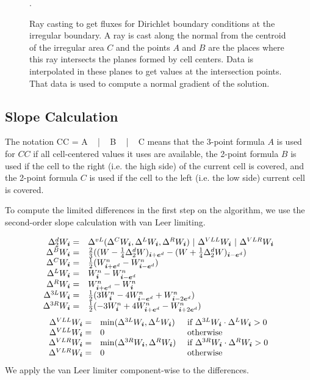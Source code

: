 \begin{figure}
\hspace{0.5in}  \epsfxsize=3.5in 
\caption{Ray casting to get fluxes for Dirichlet boundary conditions
  at the irregular boundary.   A ray is cast along the normal from the
  centroid of the irregular area $C$ and the points $A$ and $B$ are
  the places where this ray intersects the planes formed by cell
  centers.   Data is interpolated  in these planes to get
  values at the intersection points.    That data is used to compute a
  normal gradient of the solution.}
\label{fig::johansenExtrap3d}.    
\end{figure}
\subsection{Slope Calculation} \label{sec::slopeCalculation}
  
The notation
\beqa
CC = A ~ | ~ B ~ | ~ C
\eeqa
means that
the 3-point formula $A$ is used for $CC$ if all cell-centered values it uses
are available,
the 2-point formula $B$ is used if the cell to the right (i.e. the high side) of the current cell is covered, and
the 2-point formula $C$ is used if the cell to the left (i.e. the low side) current cell is covered. 

To compute the limited differences in the first step on the algorithm, we use the second-order slope calculation 
\cite{BCG} with van Leer limiting.

$$
\begin{array}{r l}
\Delta^d_2 W_\ibold = & 
\Delta^{vL}(\Delta^C W_\ibold, \Delta^L W_\ibold, \Delta^R
W_\ibold)~|~\Delta^{VLL} W_\ibold~|~\Delta^{VLR} W_\ibold \\ 
\Delta^B W_\ibold = &  \frac{2}{3}((W -\frac{1}{4}\Delta^d_2
W)_{\ibold + \ebold^d} - 
(W + \frac{1}{4}\Delta^d_2 W)_{\ibold -\ebold^d}) \\
\Delta^C {W}_\ibold = &  \half(W^n_{\ibold+\ebold^d} -
                                 W^n_{\ibold-\ebold^d}) \\
\Delta^L {W}_\ibold = &  W^n_\ibold           - W^n_{\ibold-\ebold^d} \\ 
\Delta^R {W}_\ibold = & W^n_{\ibold+\ebold^d} - W^n_\ibold  \\
\Delta^{3L} {W}_\ibold = &  \frac{1}{2}(3 W^n_\ibold -4 W^n_{\ibold-\ebold^d} + W^n_{\ibold-2\ebold^d})\\ 
\Delta^{3R} {W}_\ibold = &  \frac{1}{2}(-3 W^n_\ibold+4
W^n_{\ibold+\ebold^d} - W^n_{\ibold+2\ebold^d}) 
\end{array}
$$
$$
\begin{array}{r l l}
\Delta^{VLL} W_\ibold =&
  \min(\Delta^{3L} W_\ibold,  \Delta^L W_{\ibold}) &
    \mbox{ if $\Delta^{3L} W_\ibold \cdot \Delta^L W_{\ibold} > 0$}
  \\
  \Delta^{VLL} W_\ibold =& 0 & \mbox{ otherwise} \\
    
\Delta^{VLR} W_\ibold =&
  \min(\Delta^{3R} W_\ibold,  \Delta^R W_{\ibold}) &
    \mbox{ if $\Delta^{3R} W_\ibold \cdot \Delta^R W_{\ibold} > 0$}
  \\
  \Delta^{VLR} W_\ibold =& 0 &  \mbox{ otherwise}
  \end{array} 
$$
We apply the van Leer limiter  
component-wise to the differences. 

